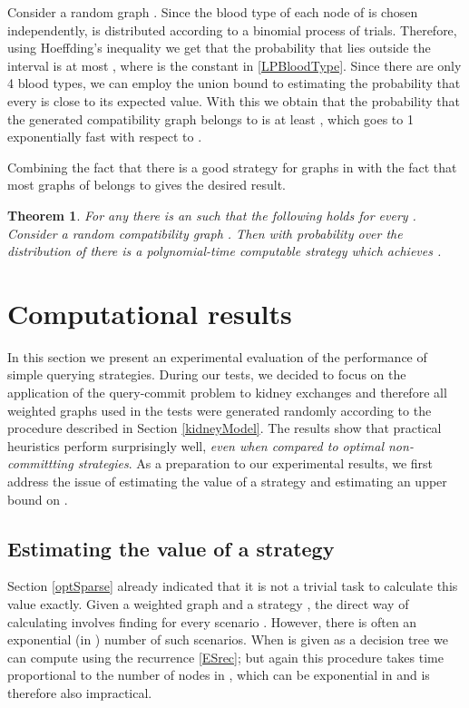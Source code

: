 \documentclass[12pt]{article}
\newtheorem{theo}{Theorem}
\begin{document}
		Consider a random graph . Since the blood type of each node of  is chosen independently,  is  distributed according to a binomial process of  trials. Therefore, using Hoeffding's inequality \cite{BoucheronLB03} we get that the probability that  lies outside the interval  is at most , where  is the constant in \eqref{LPBloodType}. Since there are only 4 blood types, we can employ the union bound to estimating the probability that every  is close to its expected value. With this we obtain that the probability that the generated compatibility graph belongs to  is at least , which goes to 1 exponentially fast with respect to .
		
		Combining the fact that there is a good strategy for graphs in  with the fact that most graphs of  belongs to  gives the desired result. 
		
		\begin{theo} \label{thmKidney}
			For any  there is an  such that the following holds for every . Consider a random compatibility graph . Then with probability  over the distribution of  there is a polynomial-time computable strategy  which achieves . 
		\end{theo}


	\section{Computational results} \label{experimental}
		
		In this section we present an experimental evaluation of the performance of simple querying strategies. During our tests, we decided to focus on the application of the query-commit problem to kidney exchanges and therefore all weighted graphs used in the tests were generated randomly according to the procedure described in Section \ref{kidneyModel}. The results show that practical heuristics perform surprisingly well, \emph{even when compared to optimal non-committting strategies}. As a preparation to our experimental results, we first address the issue of estimating the value of a strategy and estimating an upper bound on .
		
		\subsection{Estimating the value of a strategy} \label{value}
		
		 Section \ref{optSparse} already indicated that it is not a trivial task to calculate this value exactly. Given a weighted graph  and a strategy , the direct way of calculating  involves finding  for every scenario . However, there is often an exponential (in ) number of such scenarios. When  is given as a decision tree  we can compute  using the recurrence \eqref{ESrec}; but again this procedure takes time proportional to the number of nodes in , which can be exponential in  and is therefore also impractical. 
		
\end{document}

